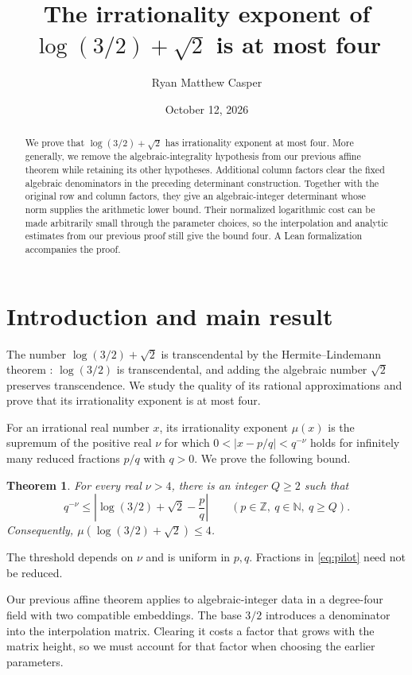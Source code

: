 \documentclass[11pt]{article}
\title{The irrationality exponent of\texorpdfstring{\\$\log(3/2)+\sqrt2$}{ log(3/2) + sqrt(2)} is at most four}
\author{Ryan Matthew Casper}
\date{October 12, 2026}
\newcommand{\Z}{\mathbb Z}
\newcommand{\N}{\mathbb N}
\newtheorem{theorem}{Theorem}[section]
\theoremstyle{remark}
\begin{document}
\maketitle
\begin{abstract}
We prove that $\log(3/2)+\sqrt2$ has irrationality exponent at most four.
More generally, we remove the algebraic-integrality hypothesis from our
previous affine theorem while retaining its other hypotheses.
Additional column factors clear the fixed algebraic denominators in
the preceding determinant construction. Together with the original row
and column factors, they give an algebraic-integer determinant whose
norm supplies the arithmetic lower bound. Their normalized logarithmic
cost can be made arbitrarily small through the parameter choices, so
the interpolation and analytic estimates from our previous proof still
give the bound four. A Lean formalization accompanies the proof.
\end{abstract}

\section{Introduction and main result}
The number $\log(3/2)+\sqrt2$ is transcendental by the
Hermite--Lindemann theorem \cite{lindemann}: $\log(3/2)$ is
transcendental, and adding the algebraic number $\sqrt2$ preserves
transcendence. We study the quality of its rational approximations
and prove that its irrationality exponent is at most four.

For an irrational real number $x$, its irrationality exponent $\mu(x)$
is the supremum of the positive real $\nu$ for which
$0<|x-p/q|<q^{-\nu}$ holds for infinitely many reduced fractions
$p/q$ with $q>0$. We prove the following bound.

\begin{theorem}\label{thm:pilot}
For every real $\nu>4$, there is an integer $Q\ge2$ such that
\begin{equation}\label{eq:pilot}
 q^{-\nu}\le \left|\log(3/2)+\sqrt2-\frac pq\right|
 \qquad(p\in\Z,\ q\in\N,\ q\ge Q).
\end{equation}
Consequently, $\mu(\log(3/2)+\sqrt2)\le4$.
\end{theorem}

The threshold depends on $\nu$ and is uniform in $p,q$. Fractions in
\eqref{eq:pilot} need not be reduced.

Our previous affine theorem \cite{affine} applies to algebraic-integer
data in a degree-four field with two compatible embeddings. The base
$3/2$ introduces a denominator into the interpolation matrix. Clearing
it costs a factor that grows with the matrix height, so we must account
for that factor when choosing the earlier parameters.
\end{document}
